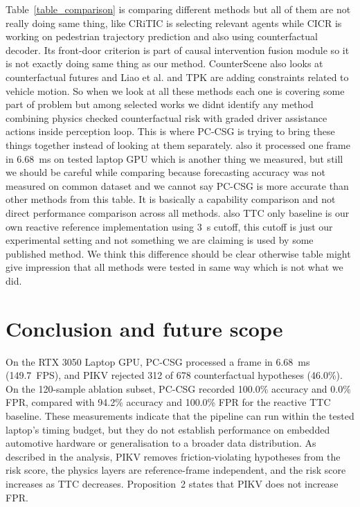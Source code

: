 \documentclass[preprint,12pt]{elsarticle}
\begin{document}
Table~\ref{table_comparison} is comparing different methods but all of them are not really doing same thing, like CRiTIC \cite{ahmadi2025critic} is selecting relevant agents while CICR \cite{han2025cicr} is working on pedestrian trajectory prediction and also using counterfactual decoder. Its front-door criterion is part of causal intervention fusion module so it is not exactly doing same thing as our method. CounterScene \cite{jing2026counterscene} also looks at counterfactual futures and Liao et al. \cite{liao2024physics} and TPK \cite{baden2025tpk} are adding constraints related to vehicle motion. So when we look at all these methods each one is covering some part of problem but among selected works we didnt identify any method combining physics checked counterfactual risk with graded driver assistance actions inside perception loop. This is where PC-CSG is trying to bring these things together instead of looking at them separately. also it processed one frame in 6.68~ms on tested laptop GPU which is another thing we measured, but still we should be careful while comparing because forecasting accuracy was not measured on common dataset and we cannot say PC-CSG is more accurate than other methods from this table. It is basically a capability comparison and not direct performance comparison across all methods. also TTC only baseline is our own reactive reference implementation using 3~s cutoff, this cutoff is just our experimental setting and not something we are claiming is used by some published method. We think this difference should be clear otherwise table might give impression that all methods were tested in same way which is not what we did.

\section{Conclusion and future scope} \label{section5}
On the RTX 3050 Laptop GPU, PC-CSG processed a frame in 6.68~ms (149.7~FPS), and PIKV rejected 312 of 678 counterfactual hypotheses (46.0\%). On the 120-sample ablation subset, PC-CSG recorded 100.0\% accuracy and 0.0\% FPR, compared with 94.2\% accuracy and 100.0\% FPR for the reactive TTC baseline. These measurements indicate that the pipeline can run within the tested laptop's timing budget, but they do not establish performance on embedded automotive hardware or generalisation to a broader data distribution. As described in the analysis, PIKV removes friction-violating hypotheses from the risk score, the physics layers are reference-frame independent, and the risk score increases as TTC decreases. Proposition~2 states that PIKV does not increase FPR.
\end{document}
